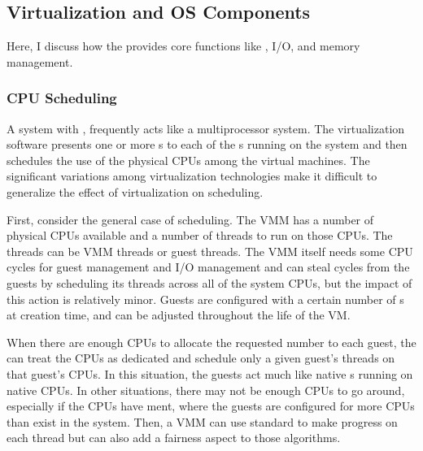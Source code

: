 \subsection{Virtualization and OS Components}\label{subsec:Virtualization_OS_Components}
Here, I discuss how the  provides core  functions like , I/O, and memory management.

\subsubsection{CPU Scheduling}\label{subsubsec:VM_CPU_Scheduling}
A system with , frequently acts like a multiprocessor system.
The virtualization software presents one or more s to each of the s running on the system and then schedules the use of the physical CPUs among the virtual machines.
The significant variations among virtualization technologies make it difficult to generalize the effect of virtualization on scheduling.

First, consider the general case of  scheduling.
The VMM has a number of physical CPUs available and a number of threads to run on those CPUs.
The threads can be VMM threads or guest threads.
The VMM itself needs some CPU cycles for guest management and I/O management and can steal cycles from the guests by scheduling its threads across all of the system CPUs, but the impact of this action is relatively minor.
Guests are configured with a certain number of s at creation time, and can be adjusted throughout the life of the VM.\@

When there are enough CPUs to allocate the requested number to each guest, the  can treat the CPUs as dedicated and schedule only a given guest's threads on that guest's CPUs.
In this situation, the guests act much like native s running on native CPUs.
In other situations, there may not be enough CPUs to go around, especially if the CPUs have ment, where the guests are configured for more CPUs than exist in the system.
Then, a VMM can use standard  to make progress on each thread but can also add a fairness aspect to those algorithms.


